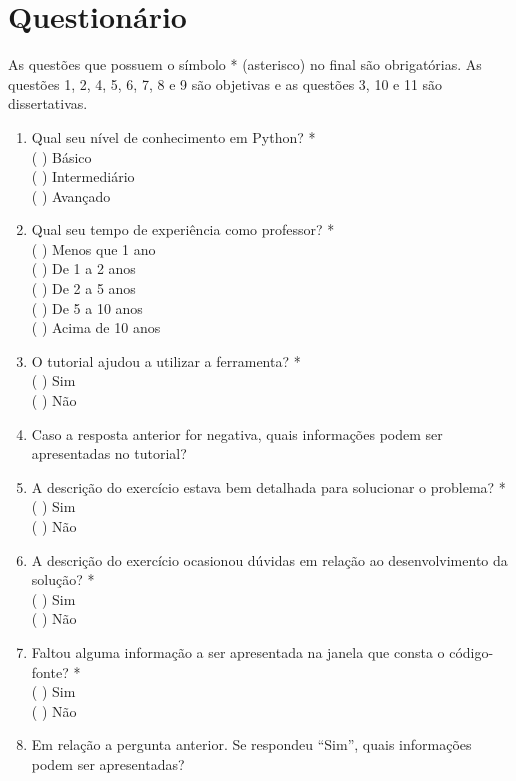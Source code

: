 \chapter{Questionário}
\label{apendice:questionario}

As questões que possuem o símbolo * (asterisco) no final são obrigatórias. As
questões 1, 2, 4, 5, 6, 7, 8 e 9 são objetivas e as questões 3, 10 e 11 são dissertativas.

\begin{enumerate}
	\item Qual seu nível de conhecimento em Python? *\\
	(  ) Básico\\
	(  ) Intermediário\\
	(  ) Avançado
	 	
	\item Qual seu tempo de experiência como professor? *\\
	(  ) Menos que 1 ano\\
	(  ) De 1 a 2 anos\\
	(  ) De 2 a 5 anos\\
	(  ) De 5 a 10 anos\\
	(  ) Acima de 10 anos
	
	\item O tutorial ajudou a utilizar a ferramenta? *\\
	(  ) Sim\\
	(  ) Não
	
	\item Caso a resposta anterior for negativa, quais informações podem ser apresentadas no tutorial?
	
	\item A descrição do exercício estava bem detalhada para solucionar o problema? *\\
	(  ) Sim\\
	(  ) Não
	
	\item A descrição do exercício ocasionou dúvidas em relação ao desenvolvimento da solução? *\\
	(  ) Sim\\
	(  ) Não
	
	\item Faltou alguma informação a ser apresentada na janela que consta o código-fonte? *\\
	(  ) Sim\\
	(  ) Não
	
	\item Em relação a pergunta anterior. Se respondeu ``Sim'', quais informações podem ser apresentadas?
	

\end{enumerate}
